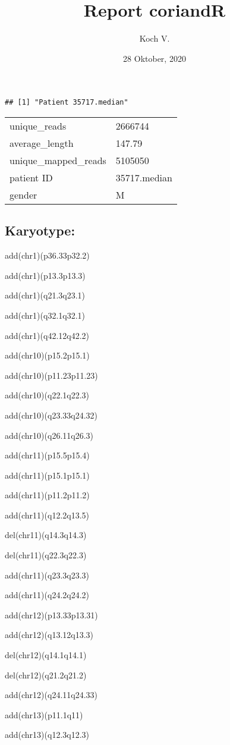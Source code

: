 \documentclass[]{article}
\title{Report coriandR}
\author{Koch V.}
\date{28 Oktober, 2020}
\begin{document}
\maketitle

\begin{verbatim}
## [1] "Patient 35717.median"
\end{verbatim}

\begin{longtable}[]{@{}ll@{}}
\toprule
\endhead
unique\_reads & 2666744\tabularnewline
average\_length & 147.79\tabularnewline
unique\_mapped\_reads & 5105050\tabularnewline
patient ID & 35717.median\tabularnewline
gender & M\tabularnewline
\bottomrule
\end{longtable}

\hypertarget{karyotype}{%
\subsection{Karyotype:}\label{karyotype}}

add(chr1)(p36.33p32.2)

add(chr1)(p13.3p13.3)

add(chr1)(q21.3q23.1)

add(chr1)(q32.1q32.1)

add(chr1)(q42.12q42.2)

add(chr10)(p15.2p15.1)

add(chr10)(p11.23p11.23)

add(chr10)(q22.1q22.3)

add(chr10)(q23.33q24.32)

add(chr10)(q26.11q26.3)

add(chr11)(p15.5p15.4)

add(chr11)(p15.1p15.1)

add(chr11)(p11.2p11.2)

add(chr11)(q12.2q13.5)

del(chr11)(q14.3q14.3)

del(chr11)(q22.3q22.3)

add(chr11)(q23.3q23.3)

add(chr11)(q24.2q24.2)

add(chr12)(p13.33p13.31)

add(chr12)(q13.12q13.3)

del(chr12)(q14.1q14.1)

del(chr12)(q21.2q21.2)

add(chr12)(q24.11q24.33)

add(chr13)(p11.1q11)

add(chr13)(q12.3q12.3)
\end{document}
